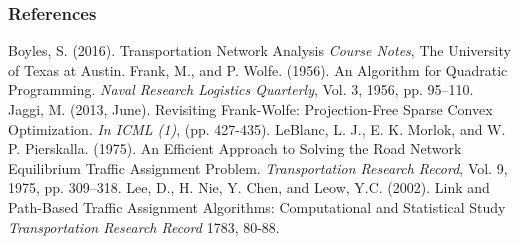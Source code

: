 \documentclass{beamer}
\begin{document}
	\begin{frame}
	\frametitle{References}
	\footnotesize{
		\begin{thebibliography}{80} 
			 Boyles, S. (2016).
			\newblock Transportation Network Analysis 
			\newblock \emph{Course Notes}, The University of Texas at Austin.
			Frank, M., and P. Wolfe. (1956).
			\newblock An Algorithm for Quadratic Programming. 
			\newblock \emph{Naval Research Logistics Quarterly}, Vol. 3, 1956, pp. 95–110.
			Jaggi, M. (2013, June).
			\newblock Revisiting Frank-Wolfe: Projection-Free Sparse Convex Optimization.  
			\newblock \emph{In ICML (1)}, (pp. 427-435).
			 LeBlanc, L. J., E. K. Morlok, and W. P. Pierskalla. (1975).
			\newblock An Efficient Approach to Solving the Road Network Equilibrium Traffic Assignment Problem.
			\newblock \emph{Transportation Research Record}, Vol. 9, 1975, pp. 309–318.
			 Lee, D., H. Nie, Y. Chen, and Leow, Y.C. (2002).
			\newblock Link and Path-Based Traffic Assignment Algorithms: Computational and Statistical Study
			\newblock \emph{Transportation Research Record} 1783, 80-88.
		\end{thebibliography}
	}
	\end{frame}
\end{document}
